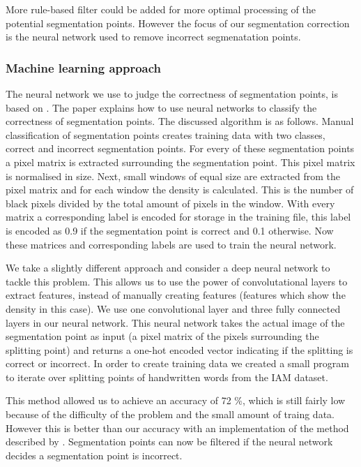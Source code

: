\documentclass{article}
\begin{document}
More rule-based filter could be added for more optimal processing of the potential segmentation points.
However the focus of our segmentation correction is the neural network used to remove incorrect segmenatation points.


\subsubsection{Machine learning approach}
The neural network we use to judge the correctness of segmentation points, is based on \cite{evalsplitpointsnn}. The paper explains how to use neural networks to classify the correctness of segmentation points. The discussed algorithm is as follows. Manual classification of segmentation points creates training data with two classes, correct and incorrect segmentation points.
For every of these segmentation points a pixel matrix is extracted surrounding the segmentation point. This pixel matrix is normalised in size.
Next, small windows of equal size are extracted from the pixel matrix and for each window the density is calculated. This is the number of black pixels divided by the total amount of pixels in the window.
With every matrix a corresponding label is encoded for storage in the training file, this label is encoded as 0.9 if the segmentation point is correct and 0.1 otherwise. Now these matrices and corresponding labels are used to train the neural network.

We take a slightly different approach and consider a deep neural network to tackle this problem. This allows us to use the power of convolutational layers to extract features, instead of manually creating features (features which show the density in this case).
We use one convolutional layer and three fully connected layers in our neural network. This neural network takes the actual image of the segmentation point as input (a pixel matrix of the pixels surrounding the splitting point) and returns a one-hot encoded vector indicating if the splitting is correct or incorrect. In order to create training data we created a small program to iterate over splitting points of handwritten words from the IAM dataset. \cite{iam}

This method allowed us to achieve an accuracy of 72 \%, which is still fairly low because of the difficulty of the problem and the small amount of traing data. However this is better than our accuracy with an implementation of the method described by \cite{evalsplitpointsnn}.
Segmentation points can now be filtered if the neural network decides a segmentation point is incorrect.
\end{document}
